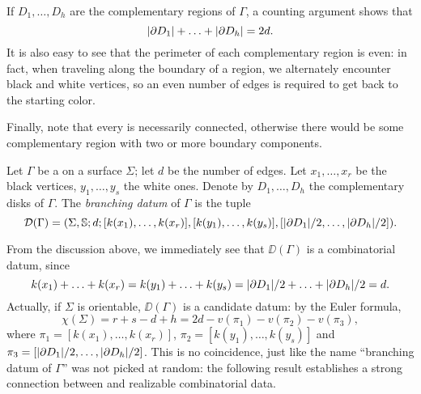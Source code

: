 If $D_1,\ldots,D_h$ are the complementary regions of $\Gamma$, a counting argument shows that
\[
\lvert \partial D_1\rvert+\ldots+\lvert \partial D_h\rvert=2d.
\]
It is also easy to see that the perimeter of each complementary region is even: in fact, when traveling along the boundary of a region, we alternately encounter black and white vertices, so an even number of edges is required to get back to the starting color.

Finally, note that every \dessin{} is necessarily connected, otherwise there would be some complementary region with two or more boundary components.

\begin{definition}
Let $\Gamma$ be a \dessin{} on a surface $\Sigma$; let $d$ be the number of edges. Let $x_1,\ldots,x_r$ be the black vertices, $y_1,\ldots,y_s$ the white ones. Denote by $D_1,\ldots,D_h$ the complementary disks of $\Gamma$. The \emph{branching datum} of $\Gamma$ is the tuple
\[
\mathcal{D}(\Gamma)=(\Sigma,\mathbb{S}{};d;[k(x_1),\ldots,k(x_r)],[k(y_1),\ldots,k(y_s)],[\lvert \partial D_1\rvert/2,\ldots,\lvert \partial D_h\rvert/2]).
\]
\end{definition}

From the discussion above, we immediately see that $\DD(\Gamma)$ is a combinatorial datum, since
\[
k(x_1)+\ldots+k(x_r)=k(y_1)+\ldots+k(y_s)=\lvert \partial D_1\rvert/2+\ldots+\lvert \partial D_h\rvert/2=d.
\]
Actually, if $\Sigma$ is orientable, $\DD(\Gamma)$ is a candidate datum: by the Euler formula,
\[
\chi(\Sigma)=r+s-d+h=2d-v(\pi_1)-v(\pi_2)-v(\pi_3),
\]
where $\pi_1=[k(x_1),\ldots,k(x_r)]$, $\pi_2=[k(y_1),\ldots,k(y_s)]$ and $\pi_3=[\lvert \partial D_1\rvert/2,\ldots,\lvert \partial D_h\rvert/2]$. This is no coincidence, just like the name ``branching datum of $\Gamma$'' was not picked at random: the following result establishes a strong connection between \dessins{} and realizable combinatorial data.

